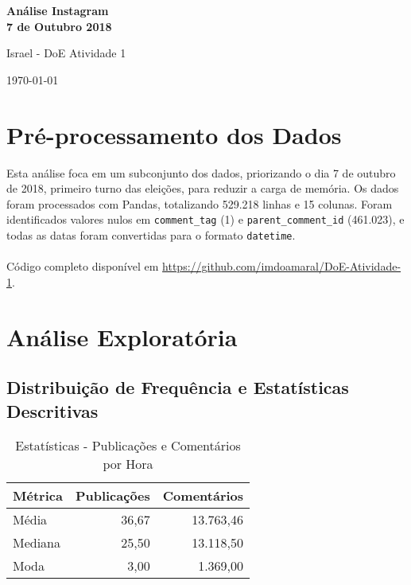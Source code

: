 \documentclass[a4paper]{article}
\begin{document}
\begin{titlepage}
    \centering
    \vspace*{2cm}
    {\Huge\bfseries Análise Instagram\\7 de Outubro 2018\par}
    \vspace{1cm}
    {\Large Israel - DoE Atividade 1\par}
    \vspace{2cm}
    {\large \today\par}
\end{titlepage}

\section{Pré-processamento dos Dados}
Esta análise foca em um subconjunto dos dados, priorizando o dia 7 de outubro de 2018, primeiro turno das eleições, para reduzir a carga de memória. Os dados foram processados com Pandas, totalizando 529.218 linhas e 15 colunas. Foram identificados valores nulos em \texttt{comment\_tag} (1) e \texttt{parent\_comment\_id} (461.023), e todas as datas foram convertidas para o formato \texttt{datetime}. \\ \\

Código completo disponível em \url{https://github.com/imdoamaral/DoE-Atividade-1}.

\newpage

\section{Análise Exploratória}
\subsection{Distribuição de Frequência e Estatísticas Descritivas}
\begin{table}[htbp]
    \centering
    \caption{Estatísticas - Publicações e Comentários por Hora}
    \begin{tabular}{lrr}
        \toprule
        \textbf{Métrica} & \textbf{Publicações} & \textbf{Comentários} \\
        \midrule
        Média & 36,67 & 13.763,46 \\
        Mediana & 25,50 & 13.118,50 \\
        Moda & 3,00 & 1.369,00 \\
        \bottomrule
    \end{tabular}
\end{table}
\end{document}
